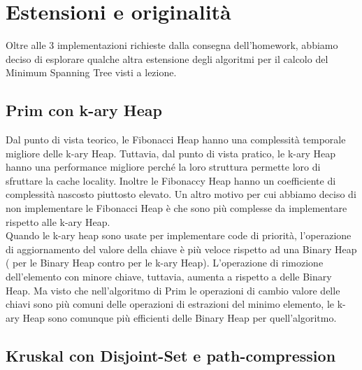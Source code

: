 \section{Estensioni e originalità}
\label{cap:extensions-and-originalities}

Oltre alle 3 implementazioni richieste dalla consegna dell'homework, abbiamo deciso di esplorare qualche altra estensione degli algoritmi per il calcolo del Minimum Spanning Tree visti a lezione.

\subsection{Prim con k-ary Heap}


Dal punto di vista teorico, le Fibonacci Heap hanno una complessità temporale migliore delle k-ary Heap.
Tuttavia, dal punto di vista pratico, le k-ary Heap hanno una performance migliore perché la loro struttura permette loro di sfruttare la cache locality. Inoltre le Fibonaccy Heap hanno un coefficiente di complessità nascosto piuttosto elevato.
Un altro motivo per cui abbiamo deciso di non implementare le Fibonacci Heap è che sono più complesse da implementare rispetto alle k-ary Heap. \\

\noindent Quando le k-ary heap sono usate per implementare code di priorità, l'operazione di aggiornamento del valore della chiave è più veloce rispetto ad una Binary Heap (\complexityLogN{} per le Binary Heap contro \complexityLogkN{} per le k-ary Heap).
L'operazione di rimozione dell'elemento con minore chiave, tuttavia, aumenta a \complexityKLogkN{} rispetto a \complexityLogkN{} delle Binary Heap. Ma visto che nell'algoritmo di Prim le operazioni di cambio valore delle chiavi sono più comuni delle operazioni di estrazioni del minimo elemento, le k-ary Heap sono comunque più efficienti delle Binary Heap per quell'algoritmo.

\subsection{Kruskal con Disjoint-Set e path-compression}

